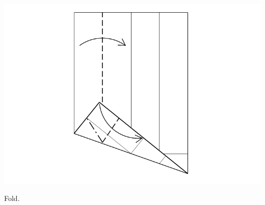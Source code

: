 \documentclass[11pt]{article}
\begin{document}
\begin{minipage}[t]{0.3\textwidth}
  \includegraphics[width=\textwidth]{../figs/fig10-06}
  \begin{itemize}{\item[6.] Fold.}\end{itemize}
\end{minipage}

\vspace*{0.5in}
\end{document}

